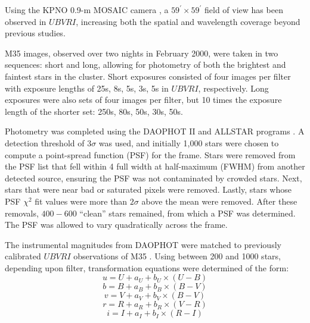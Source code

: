\documentclass[iop]{emulateapj}
\begin{document}
Using the KPNO 0.9-m MOSAIC camera \citep{2010SPIE.7735E.111S}, a $59^\prime \times 59^\prime$ field of view has been observed in $UBVRI$, increasing both the spatial and wavelength coverage beyond previous studies.

M35 images, observed over two nights in February 2000, were taken in two sequences: short and long, allowing for photometry of both the brightest and faintest stars in the cluster. Short exposures consisted of four images per filter with exposure lengths of 25s, 8s, 5s, 3s, 5s in $UBVRI$, respectively. Long exposures were also sets of four images per filter, but 10 times the exposure length of the shorter set: 250s, 80s, 50s, 30s, 50s.

Photometry was completed using the DAOPHOT II and ALLSTAR programs \citep{1987PASP...99..191S}. A detection threshold of $3\sigma$ was used, and initially 1,000 stars were chosen to compute a point-spread function (PSF) for the frame. Stars were removed from the PSF list that fell within 4 full width at half-maximum (FWHM) from another detected source, ensuring the PSF was not contaminated by crowded stars. Next, stars that were near bad or saturated pixels were removed. Lastly, stars whose PSF $\chi^2$ fit values were more than $2\sigma$ above the mean were removed. After these removals, $400-600$ ``clean'' stars remained, from which a PSF was determined. The PSF was allowed to vary quadratically across the frame.

The instrumental magnitudes from DAOPHOT were matched to previously calibrated $UBVRI$ observations of M35 \citep{2000AAS...196.4206S}. Using between 200 and 1000 stars, depending upon filter, transformation equations were determined of the form:
\begin{equation} \label{eq:Utrans}
	u = U + a_U + b_U \times (U-B)
\end{equation}
\begin{equation} \label{eq:Btrans}
	b = B + a_B + b_B \times (B-V)
\end{equation}
\begin{equation} \label{eq:Vtrans}
	v = V + a_V + b_V \times (B-V)
\end{equation}
\begin{equation} \label{eq:Rtrans}
	r = R + a_R + b_R \times (V-R)
\end{equation}
\begin{equation} \label{eq:Itrans}
	i = I + a_I + b_I \times (R-I)
\end{equation}
\end{document}
